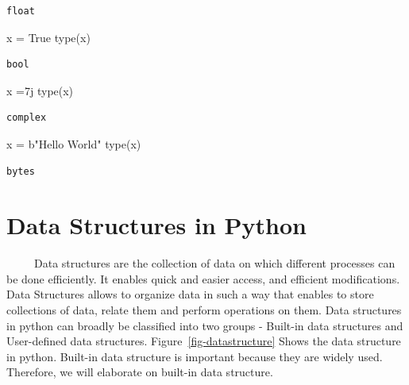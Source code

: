 \documentclass[
  letterpaper,
  DIV=11,
  numbers=noendperiod]{scrreprt}
\newenvironment{Shaded}{\begin{snugshade}}{\end{snugshade}}
\newcommand{\BuiltInTok}[1]{\textcolor[rgb]{0.00,0.23,0.31}{#1}}
\newcommand{\NormalTok}[1]{\textcolor[rgb]{0.00,0.23,0.31}{#1}}
\newcommand{\OperatorTok}[1]{\textcolor[rgb]{0.37,0.37,0.37}{#1}}
\newcommand{\OtherTok}[1]{\textcolor[rgb]{0.00,0.23,0.31}{#1}}
\newcommand{\StringTok}[1]{\textcolor[rgb]{0.13,0.47,0.30}{#1}}
\newcommand{\VariableTok}[1]{\textcolor[rgb]{0.07,0.07,0.07}{#1}}
\begin{document}
\begin{verbatim}
float
\end{verbatim}

\begin{Shaded}
\begin{Highlighting}[]
\NormalTok{x }\OperatorTok{=} \VariableTok{True}
\BuiltInTok{type}\NormalTok{(x)}
\end{Highlighting}
\end{Shaded}

\begin{verbatim}
bool
\end{verbatim}

\begin{Shaded}
\begin{Highlighting}[]
\NormalTok{x }\OperatorTok{=}\OtherTok{7j}
\BuiltInTok{type}\NormalTok{(x)}
\end{Highlighting}
\end{Shaded}

\begin{verbatim}
complex
\end{verbatim}

\begin{Shaded}
\begin{Highlighting}[]
\NormalTok{x }\OperatorTok{=} \StringTok{b"Hello World"}
\BuiltInTok{type}\NormalTok{(x)}
\end{Highlighting}
\end{Shaded}

\begin{verbatim}
bytes
\end{verbatim}

\section{Data Structures in Python}\label{data-structures-in-python}

~~~~~Data structures are the collection of data on which different
processes can be done efficiently. It enables quick and easier access,
and efficient modifications. Data Structures allows to organize data in
such a way that enables to store collections of data, relate them and
perform operations on them. Data structures in python can broadly be
classified into two groups - Built-in data structures and User-defined
data structures. Figure~\ref{fig-datastructure} Shows the data structure
in python. Built-in data structure is important because they are widely
used. Therefore, we will elaborate on built-in data structure.
\end{document}
